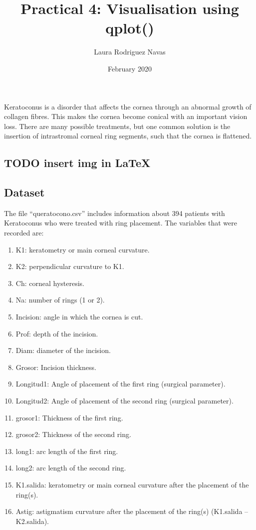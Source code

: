 \documentclass[
]{article}
\title{Practical 4: Visualisation using qplot()}
\author{Laura Rodriguez Navas}
\date{February 2020}
\providecommand{\tightlist}{%
  \setlength{\itemsep}{0pt}\setlength{\parskip}{0pt}}
\begin{document}
\maketitle

Keratoconus is a disorder that affects the cornea through an abnormal
growth of collagen fibres. This makes the cornea become conical with an
important vision loss. There are many possible treatments, but one
common solution is the insertion of intrastromal corneal ring segments,
such that the cornea is flattened.

\hypertarget{todo-insert-img-in-latex}{%
\subsection{TODO insert img in LaTeX}\label{todo-insert-img-in-latex}}

\hypertarget{dataset}{%
\subsection{Dataset}\label{dataset}}

The file ``queratocono.csv'' includes information about 394 patients
with Keratoconus who were treated with ring placement. The variables
that were recorded are:

\begin{enumerate}
\def\labelenumi{\arabic{enumi}.}
\tightlist
\item
  K1: keratometry or main corneal curvature.
\item
  K2: perpendicular curvature to K1.
\item
  Ch: corneal hysteresis.
\item
  Na: number of rings (1 or 2).
\item
  Incision: angle in which the cornea is cut.
\item
  Prof: depth of the incision.
\item
  Diam: diameter of the incision.
\item
  Grosor: Incision thickness.
\item
  Longitud1: Angle of placement of the first ring (surgical parameter).
\item
  Longitud2: Angle of placement of the second ring (surgical parameter).
\item
  grosor1: Thickness of the first ring.
\item
  grosor2: Thickness of the second ring.
\item
  long1: arc length of the first ring.
\item
  long2: arc length of the second ring.
\item
  K1.salida: keratometry or main corneal curvature after the placement
  of the ring(s).
\item
  Astig: astigmatism curvature after the placement of the ring(s)
  (K1.salida -- K2.salida).
\end{enumerate}
\end{document}
